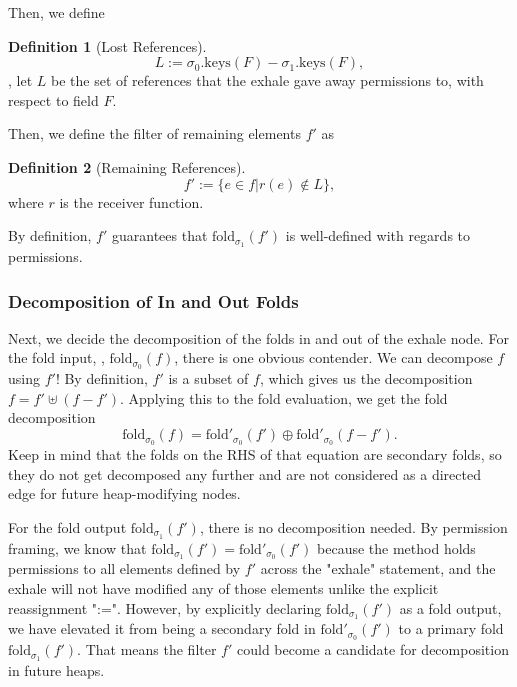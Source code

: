 \documentclass[msc,oneside]{ubcthesis}
\theoremstyle{definition}
\newtheorem{definition}{Definition}[section]
\begin{document}
Then, we define 
\begin{definition}[Lost References]\label{def:Lost}
$$L := \sigma_0.\textrm{keys}(F) - \sigma_1.\textrm{keys}(F),$$
\ie, let $L$ be the set of references that the exhale gave away permissions to, with respect to field $F$.
\end{definition}

Then, we define the filter of remaining elements $f'$ as
\begin{definition}[Remaining References]\label{def:notLost}
$$f' := \{e \in f | r(e) \not\in L \},$$ where $r$ is the receiver function. 
\end{definition}
By definition, $f'$ guarantees that $\textrm{fold}_{\sigma_1}(f')$ is well-defined with regards to permissions. 

\subsubsection{Decomposition of In and Out Folds}
Next, we decide the decomposition of the folds in and out of the exhale node. For the fold input, \ie, $\textrm{fold}_{\sigma_0}(f)$,  there is one obvious contender. We can decompose $f$ using $f'$! By definition,  $f'$ is a subset of $f$, which gives us the decomposition $f = f' \uplus (f-f')$. Applying this to the fold evaluation, we get the fold decomposition
$$\textrm{fold}_{\sigma_0}(f) = \textrm{fold}'_{\sigma_0}(f') \oplus \textrm{fold}'_{\sigma_0}(f - f').$$ Keep in mind that the folds on the RHS of that equation are secondary folds, so they do not get decomposed any further and are not considered as a directed edge for future heap-modifying nodes.

For the fold output $\textrm{fold}_{\sigma_1}(f')$, there is no decomposition needed. By permission framing, we know that $\textrm{fold}_{\sigma_1}(f') = \textrm{fold}'_{\sigma_0}(f')$ because the method holds permissions to all elements defined by $f'$ across the "exhale" statement, and the exhale will not have modified any of those elements unlike the explicit reassignment ":=". However, by explicitly declaring $\textrm{fold}_{\sigma_1}(f')$ as a fold output, we have elevated it from being a secondary fold in $\textrm{fold}'_{\sigma_0}(f')$ to a primary fold $\textrm{fold}_{\sigma_1}(f')$. That means the filter $f'$ could become a candidate for decomposition in future heaps.
\end{document}
